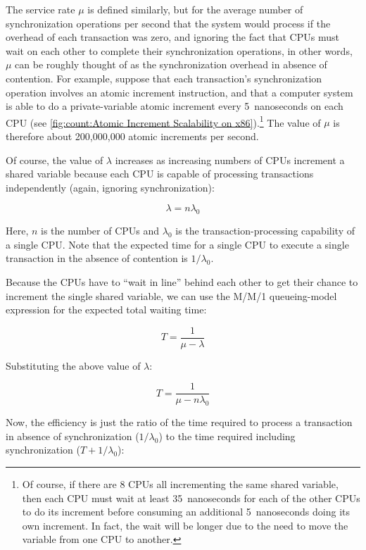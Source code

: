 The service rate $\mu$ is defined similarly, but for the average
number of synchronization operations per second that the system
would process if the overhead of each transaction was zero, and
ignoring the fact that CPUs must wait on each other to complete
their synchronization operations, in other words, $\mu$ can be roughly
thought of as the synchronization overhead in absence of contention.
For example, suppose that each transaction's synchronization operation
involves an atomic increment instruction, and that a computer system is
able to do a private-variable atomic increment every 5~nanoseconds on
each CPU
(see \cref{fig:count:Atomic Increment Scalability on x86}).\footnote{
	Of course, if there are 8 CPUs all incrementing the same
	shared variable, then each CPU must wait at least 35~nanoseconds
	for each of the other CPUs to do its increment before consuming
	an additional 5~nanoseconds doing its own increment.
	In fact, the wait will be longer due to the need
	to move the variable from one CPU to another.}
The value of $\mu$ is therefore about 200,000,000 atomic increments
per second.

Of course, the value of $\lambda$ increases as increasing numbers of CPUs
increment a shared variable because each CPU is capable of processing
transactions independently (again, ignoring synchronization):

\begin{equation}
	\lambda = n \lambda_0
\end{equation}

Here, $n$ is the number of CPUs and $\lambda_0$ is the transaction-processing
capability of a single CPU\@.
Note that the expected time for a single CPU to execute a single transaction
in the absence of contention is $1 / \lambda_0$.

Because the CPUs have to ``wait in line'' behind each other to get their
chance to increment the single shared variable, we can use the M/M/1
queueing-model expression for the expected total waiting time:

\begin{equation}
	T = \frac{1}{\mu - \lambda}
\end{equation}

Substituting the above value of $\lambda$:

\begin{equation}
	T = \frac{1}{\mu - n \lambda_0}
\end{equation}

Now, the efficiency is just the ratio of the time required to process
a transaction in absence of synchronization ($1 / \lambda_0$)
to the time required including synchronization ($T + 1 / \lambda_0$):

